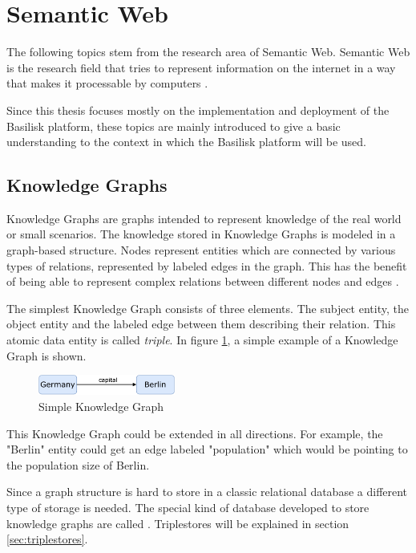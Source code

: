 \section{Semantic Web}
\label{sec:sw_topics}
The following topics stem from the research area of Semantic Web.
Semantic Web is the research field that tries to represent information on the internet in a way that makes it processable by computers \cite{hitzlerSemanticWebGrundlagen2008}.

Since this thesis focuses mostly on the implementation and deployment of the Basilisk platform, these topics are mainly introduced to give a basic understanding to the context in which the Basilisk platform will be used.

\subsection{Knowledge Graphs} 
\label{sec:knowledge_graphs}
Knowledge Graphs are graphs intended to represent knowledge of the real world or small scenarios.
The knowledge stored in Knowledge Graphs is modeled in a graph-based structure. 
Nodes represent entities which are connected by various types of relations, represented by labeled edges in the graph.
This has the benefit of being able to represent complex relations between different nodes and edges \cite{hoganKnowledgeGraphs2021}.

The simplest Knowledge Graph consists of three elements.
The subject entity, the object entity and the labeled edge between them describing their relation.
This atomic data entity is called \emph{triple}.
In figure \ref{fig:example-knowledge-graph}, a simple example of a Knowledge Graph is shown.

\begin{figure}[tbph]
	\centering
	\includegraphics[width=0.4\textwidth]{figures/knowledge-graph-diagram}
	\caption{Simple Knowledge Graph}
	\label{fig:example-knowledge-graph}
\end{figure}

This Knowledge Graph could be extended in all directions.
For example, the "Berlin" entity could get an edge labeled "population" which would be pointing to the population size of Berlin.

Since a graph structure is hard to store in a classic relational database a different type of storage is needed.
The special kind of database developed to store knowledge graphs are called \tsp{}.
Triplestores will be explained in section \ref{sec:triplestores}.


